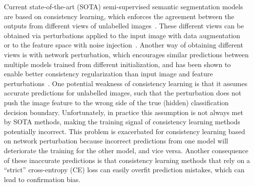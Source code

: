 \documentclass[10pt,twocolumn,letterpaper]{article}
\begin{document}
Current state-of-the-art (SOTA) semi-supervised semantic segmentation models are based on consistency learning, 
which enforces the agreement between the outputs from different views of unlabelled images~\cite{ouali2020semi, zou2020pseudoseg, french2019semi,chen2021semi}. 
These different views can be obtained via perturbations applied to the input image with data augmentation~\cite{zou2020pseudoseg} or to the feature space with noise injection~\cite{ouali2020semi}. Another way of obtaining different views is with network perturbation, which encourages similar predictions between multiple models trained from different initialization, and has been shown to enable better consistency regularization than input image and feature perturbations~\cite{chen2021semi, ke2020guided}.
One potential weakness of consistency learning is that it assumes accurate predictions for unlabelled images, such that the perturbation does not push the image feature to the wrong side of the true (hidden) classification decision boundary. 
Unfortunately, in practice this assumption is not always met by SOTA methods, making the training signal of consistency learning methods potentially incorrect. 
This problem is exacerbated for consistency learning based on network perturbation because incorrect predictions from one model will deteriorate the training for the other model, and vice versa.
Another consequence of these inaccurate predictions is that consistency learning methods that rely on a ``strict'' cross-entropy (CE) loss can easily overfit prediction mistakes, which can lead to confirmation bias.
\end{document}

